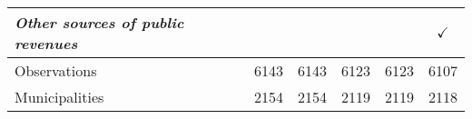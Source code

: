 \begin{tabular}{lccccc}
\textit{Other sources of public revenues}  	& 					&   
												& 
												& 
												&
								$\checkmark$   \\


\midrule		


Observations 			&	 6143   &   
							 6143   & 
							 6123   & 
							 6123   &
							 6107   \\

Municipalities  		&    2154   &   
							 2154   & 
							 2119   & 
							 2119   &
							 2118   \\


\bottomrule

\end{tabular}%
